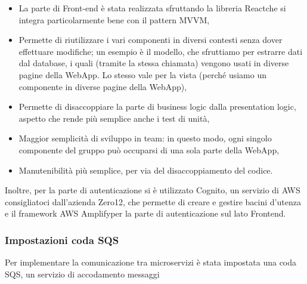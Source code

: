 \begin{itemize}
\item La parte di Front-end è stata realizzata sfruttando la libreria React\glo che si integra particolarmente bene con il pattern MVVM,
\item Permette di riutilizzare i vari componenti in diversi contesti senza dover effettuare modifiche; un esempio è il modello, che sfruttiamo per estrarre dati dal database, i quali (tramite la stessa chiamata) vengono usati in diverse pagine della WebApp. Lo stesso vale per la vista (perché usiamo un componente in diverse pagine della WebApp),
\item Permette di disaccoppiare la parte di business logic dalla presentation logic, aspetto che rende più semplice anche i test di unità,
\item Maggior semplicità di sviluppo in team: in questo modo, ogni singolo componente del gruppo può occuparsi di una sola parte della WebApp,
\item Manutenibilità più semplice, per via del disaccoppiamento del codice.
\end{itemize}
Inoltre, per la parte di autenticazione si è utilizzato Cognito\glo, un servizio di AWS consigliatoci dall'azienda Zero12, che permette di creare e gestire bacini d'utenza e il framework AWS Amplify\glo per la parte di autenticazione sul lato Frontend.

\subsubsection{Impostazioni coda SQS}
Per implementare la comunicazione tra microservizi è stata impostata una coda SQS, un servizio di accodamento messaggi 

